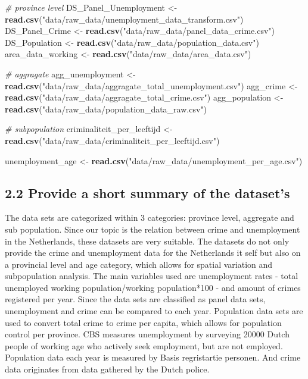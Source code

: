 \documentclass[
]{article}
\newenvironment{Shaded}{\begin{snugshade}}{\end{snugshade}}
\newcommand{\CommentTok}[1]{\textcolor[rgb]{0.56,0.35,0.01}{\textit{#1}}}
\newcommand{\FunctionTok}[1]{\textcolor[rgb]{0.13,0.29,0.53}{\textbf{#1}}}
\newcommand{\NormalTok}[1]{#1}
\newcommand{\OtherTok}[1]{\textcolor[rgb]{0.56,0.35,0.01}{#1}}
\newcommand{\StringTok}[1]{\textcolor[rgb]{0.31,0.60,0.02}{#1}}
\begin{document}
\begin{Shaded}
\begin{Highlighting}[]
\CommentTok{\# province level}
\NormalTok{DS\_Panel\_Unemployment }\OtherTok{\textless{}{-}} \FunctionTok{read.csv}\NormalTok{(}\StringTok{"data/raw\_data/unemployment\_data\_transform.csv"}\NormalTok{)}
\NormalTok{DS\_Panel\_Crime }\OtherTok{\textless{}{-}} \FunctionTok{read.csv}\NormalTok{(}\StringTok{"data/raw\_data/panel\_data\_crime.csv"}\NormalTok{)}
\NormalTok{DS\_Population }\OtherTok{\textless{}{-}} \FunctionTok{read.csv}\NormalTok{(}\StringTok{"data/raw\_data/population\_data.csv"}\NormalTok{)}
\NormalTok{area\_data\_working }\OtherTok{\textless{}{-}} \FunctionTok{read.csv}\NormalTok{(}\StringTok{"data/raw\_data/area\_data.csv"}\NormalTok{)}

\CommentTok{\# aggragate}
\NormalTok{agg\_unemployment }\OtherTok{\textless{}{-}} \FunctionTok{read.csv}\NormalTok{(}\StringTok{"data/raw\_data/aggragate\_total\_unemployment.csv"}\NormalTok{)}
\NormalTok{agg\_crime }\OtherTok{\textless{}{-}} \FunctionTok{read.csv}\NormalTok{(}\StringTok{"data/raw\_data/aggragate\_total\_crime.csv"}\NormalTok{)}
\NormalTok{agg\_population }\OtherTok{\textless{}{-}} \FunctionTok{read.csv}\NormalTok{(}\StringTok{"data/raw\_data/population\_data\_raw.csv"}\NormalTok{)}

\CommentTok{\# subpopulation}
\NormalTok{criminaliteit\_per\_leeftijd }\OtherTok{\textless{}{-}} \FunctionTok{read.csv}\NormalTok{(}\StringTok{"data/raw\_data/criminaliteit\_per\_leeftijd.csv"}\NormalTok{) }

\NormalTok{unemployment\_age }\OtherTok{\textless{}{-}} \FunctionTok{read.csv}\NormalTok{(}\StringTok{"data/raw\_data/unemployment\_per\_age.csv"}\NormalTok{) }
\end{Highlighting}
\end{Shaded}

\subsection{2.2 Provide a short summary of the
dataset's}\label{provide-a-short-summary-of-the-datasets}

The data sets are categorized within 3 categories: province level,
aggregate and sub population. Since our topic is the relation between
crime and unemployment in the Netherlands, these datasets are very
suitable. The datasets do not only provide the crime and unemployment
data for the Netherlands it self but also on a provincial level and age
category, which allows for spatial variation and subpopulation analysis.
The main variables used are unemployment rates - total unemployed
working population/working population*100 - and amount of crimes
registered per year. Since the data sets are classified as panel data
sets, unemployment and crime can be compared to each year. Population
data sets are used to convert total crime to crime per capita, which
allows for population control per province. CBS measures unemployment by
surveying 20000 Dutch people of working age who actively seek
employment, but are not employed. Population data each year is measured
by Basis regristartie personen. And crime data originates from data
gathered by the Dutch police.
\end{document}
